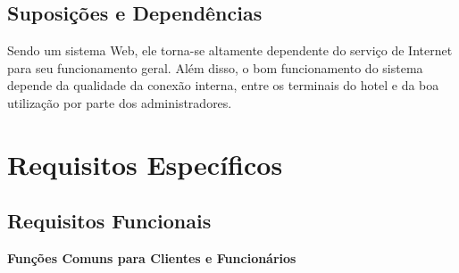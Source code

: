 \documentclass[notitlepage]{article}
\begin{document}
\subsection{Suposições e Dependências}
Sendo um sistema Web, ele torna-se altamente dependente do serviço de Internet para seu funcionamento geral.  Além disso, o bom funcionamento do sistema depende da qualidade da conexão interna, entre os terminais do hotel e da boa utilização por parte dos administradores.
\section{Requisitos Específicos}
\subsection{Requisitos Funcionais}
\textbf{Funções Comuns para Clientes e Funcionários}
\end{document}
